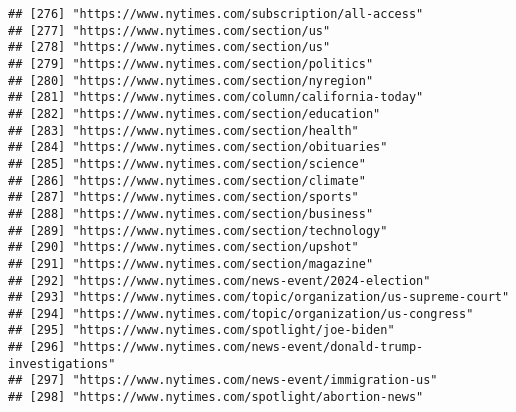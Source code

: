 \documentclass[
]{article}
\begin{document}
\begin{verbatim}
## [276] "https://www.nytimes.com/subscription/all-access"                                                           
## [277] "https://www.nytimes.com/section/us"                                                                        
## [278] "https://www.nytimes.com/section/us"                                                                        
## [279] "https://www.nytimes.com/section/politics"                                                                  
## [280] "https://www.nytimes.com/section/nyregion"                                                                  
## [281] "https://www.nytimes.com/column/california-today"                                                           
## [282] "https://www.nytimes.com/section/education"                                                                 
## [283] "https://www.nytimes.com/section/health"                                                                    
## [284] "https://www.nytimes.com/section/obituaries"                                                                
## [285] "https://www.nytimes.com/section/science"                                                                   
## [286] "https://www.nytimes.com/section/climate"                                                                   
## [287] "https://www.nytimes.com/section/sports"                                                                    
## [288] "https://www.nytimes.com/section/business"                                                                  
## [289] "https://www.nytimes.com/section/technology"                                                                
## [290] "https://www.nytimes.com/section/upshot"                                                                    
## [291] "https://www.nytimes.com/section/magazine"                                                                  
## [292] "https://www.nytimes.com/news-event/2024-election"                                                          
## [293] "https://www.nytimes.com/topic/organization/us-supreme-court"                                               
## [294] "https://www.nytimes.com/topic/organization/us-congress"                                                    
## [295] "https://www.nytimes.com/spotlight/joe-biden"                                                               
## [296] "https://www.nytimes.com/news-event/donald-trump-investigations"                                            
## [297] "https://www.nytimes.com/news-event/immigration-us"                                                         
## [298] "https://www.nytimes.com/spotlight/abortion-news"                                                           

\end{verbatim}
\end{document}
